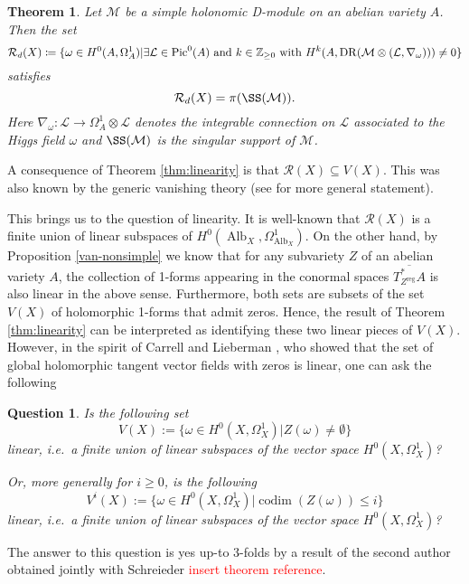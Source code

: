 \documentclass[12pt,reqno]{amsart}
\newtheorem{alphtheoremprime}{Theorem}
\theoremstyle{question}
\newtheorem{question}[theorem]{Question}
\theoremstyle{definition}
\theoremstyle{remark}
\theoremstyle{cited}
\theoremstyle{citeddef}
\DeclareMathOperator{\codim}{codim}              %
\DeclareMathOperator{\reg}{reg}                  %
\DeclareMathOperator{\Alb}{Alb}
\def\Pic{{\rm Pic}}
\newcommand{\sL}{\mathcal{L}}
\newcommand{\sM}{\mathcal{M}}
\newcommand{\sR}{\mathcal{R}}
\newcommand{\bbZ}{\mathbb{Z}}
\DeclareMathOperator{\dr}{DR}
\newcommand{\sorry}[1]{\textcolor{red}{#1}}
\begin{document}
\setcounter{alphtheoremprime}{3}
\begin{alphtheoremprime}
Let $\sM$ be a simple holonomic D-module on an abelian variety $A$.
Then the set
\[\sR_d(X)\coloneqq \{\omega\in H^0(A, \Omega_A^1)|\exists \sL \in \Pic^0(A)\text{ and } k\in\bbZ_{\geq 0} \text{ with }
H^{k}(A, \dr(\sM\otimes(\sL, \nabla_{\omega}))) \neq 0\}\]
satisfies
\[\sR_d(X) = \pi(\SS(\sM)).\]
Here $\nabla_{\omega}\colon \sL \to \Omega_A^1\otimes \sL$
denotes the integrable connection on $\sL$ associated to the Higgs
field $\omega$ and $\SS(\sM)$ is the singular support of $\sM$.
\label{thm:dlinearity}
\end{alphtheoremprime}
A consequence of Theorem \ref{thm:linearity} is that $\sR(X)\subseteq V(X)$. This was also known by the generic vanishing theory
(see \cite{BWY} for more general statement). 


This brings us to the question of linearity. It is well-known \cite[p.\ 311]{Ara92} that $\sR(X)$  is a finite union of linear subspaces of $H^0(\Alb_X, \Omega_{\Alb_X}^1)$. 
On the other hand, by Proposition \ref{van-nonsimple} we know that for any subvariety $Z$ of an abelian variety $A$, the collection
of 1-forms appearing in the conormal spaces $\overline{T^*_{Z^{\reg}}A}$ is also linear in the above sense. Furthermore, both sets are subsets of the set $V(X)$ of holomorphic 1-forms that admit zeros. Hence, the result of Theorem \ref{thm:linearity} can be interpreted as identifying these two linear pieces of $V(X)$. 
However, in the spirit of Carrell and Lieberman \cite{CL73}, who showed that
the set of global holomorphic tangent vector fields with zeros
is linear,
one can ask the following 
\begin{question}
Is the following set
\[V(X):=\{ \omega\in H^0(X, \Omega_X^1) | Z(\omega)\neq \emptyset\}\]
linear, i.e.\ a finite
union of linear subspaces of the vector space $H^0(X, \Omega_X^1)$?

Or, more generally
for $i\geq 0$, is the following 
\[V^i(X):=\{ \omega\in H^0(X, \Omega_X^1) | \codim(Z(\omega))\leq i\}\]
linear, i.e.\ a finite
union of linear subspaces of the vector space $H^0(X, \Omega_X^1)$?

\end{question} 

The answer to this question is yes up-to 3-folds by
a result of the second author obtained jointly with Schreieder
\sorry{insert theorem reference}. 


\end{document}

